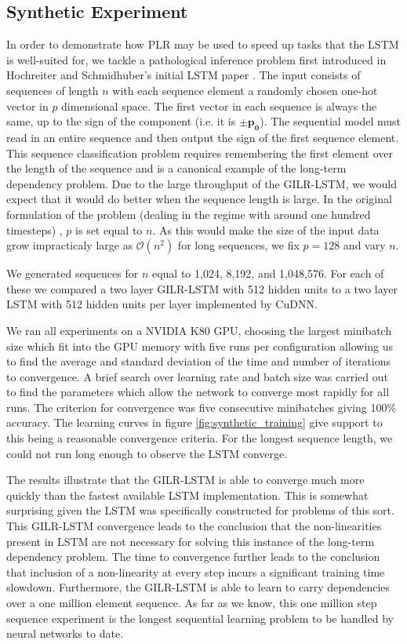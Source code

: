 \documentclass{article}
\begin{document}
\subsection{Synthetic Experiment}
In order to demonstrate how PLR may be used to speed up tasks that the LSTM is
well-suited for, we tackle a pathological inference problem first introduced
in Hochreiter and Schmidhuber's initial LSTM paper \cite{hochreiter1997long}.
The input consists of sequences of length $n$ with each sequence element a randomly
chosen one-hot vector in $p$ dimensional space.
The first vector in each sequence is always the same, up to the sign of the component (i.e. it is $\pm
\boldsymbol{p_0}$). The sequential model must read in an entire sequence and then output
the sign of the first sequence element.
This sequence classification problem requires remembering the first element over the length of the
sequence and is a canonical example of the long-term dependency problem.
Due to the large throughput of the GILR-LSTM, we would expect that it
would do better when the sequence length is large. In the original formulation
of the problem (dealing in the regime with around one hundred timesteps)
, $p$ is set equal to $n$. As this would make the size of the input data
grow impracticaly large as \(\mathcal{O}(n^2)\) for long sequences, we fix \(p =
128\) and vary \(n\).

We generated sequences for $n$ equal to 1,024, 8,192, and
1,048,576. For each of these we compared a two layer GILR-LSTM with 512 hidden
units to a two layer LSTM with 512 hidden units per layer implemented by CuDNN.

We ran all experiments on a NVIDIA K80 GPU, choosing the largest
minibatch size which fit into the GPU memory with five runs per configuration
allowing us to find the average and standard deviation of the time and number of
iterations to convergence. A brief search over learning rate
and batch size was carried out to find the parameters which allow the network to
converge most rapidly for all runs. The criterion for convergence was five consecutive
minibatches giving 100\% accuracy. The learning curves
in figure \ref{fig:synthetic_training} give support to this being a reasonable
convergence criteria.
For the longest sequence length, we could not run long enough to observe the LSTM converge.

The results illustrate that the GILR-LSTM is able to converge much more quickly than
the fastest available LSTM implementation.
This is somewhat surprising given the LSTM was specifically constructed for problems
of this sort. This GILR-LSTM convergence
leads to the conclusion that the non-linearities present in
LSTM are not necessary for solving this instance of the long-term dependency problem.
The time to convergence further leads to the conclusion that inclusion of a non-linearity
at every step incurs a significant training time slowdown.
Furthermore, the GILR-LSTM is able to learn to carry dependencies over a one million
element sequence. As far as we know, this one million step sequence experiment
is the longest sequential learning problem to be handled by neural networks to date.
\end{document}
